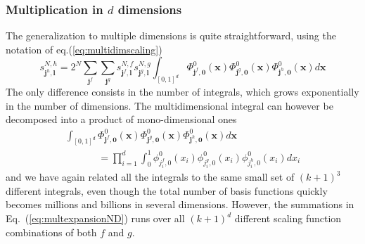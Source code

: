 \subsubsection*{Multiplication in $d$ dimensions}
The generalization to multiple dimensions is quite straightforward, using the
notation of eq.(\ref{eq:multidimscaling})
\begin{equation}
    \label{eq:multexpansionND}
    s^{N,h}_{\boldsymbol{j}^h,\boldsymbol{l}} =
	2^N \sum_{\boldsymbol{j}^f}\sum_{\boldsymbol{j}^g} 
	s_{\boldsymbol{j}^f,\boldsymbol{l}}^{N,f} 
	s_{\boldsymbol{j}^g,\boldsymbol{l}}^{N,g} \int_{[0,1]^d}
	\Phi_{\boldsymbol{j}^f,\boldsymbol{0}}^0(\boldsymbol{x})
	\Phi_{\boldsymbol{j}^g,\boldsymbol{0}}^0(\boldsymbol{x})
	\Phi_{\boldsymbol{j}^h,\boldsymbol{0}}^0(\boldsymbol{x})
	d\boldsymbol{x}
\end{equation}
The only difference consists in the number of integrals, which grows
exponentially in the number of dimensions. The multidimensional integral can
however be decomposed into a product of mono-dimensional ones
\begin{align}
    \nonumber
    \int_{[0,1]^d} 
    \Phi_{\boldsymbol{j}^f,\boldsymbol{0}}^0(\boldsymbol{x})
    \Phi_{\boldsymbol{j}^g,\boldsymbol{0}}^0(\boldsymbol{x})
    \Phi_{\boldsymbol{j}^h,\boldsymbol{0}}^0(\boldsymbol{x})
    d\boldsymbol{x}\ \ \ \ \ \ \ \ \ \ \ \ \ \ \ \ \ \ \ \ \ \ \ \ \ \ \\
    \ \ \ \ \ \ \ \ \ \ \ \ \ \ \ 
    = 	\prod_{i=1}^d \int_0^1
	\phi_{j_i^f,0}^0(x_i)\phi_{j_i^g,0}^0(x_i)\phi_{j_i^h,0}^0(x_i)dx_i
\end{align}
and we have again related all the integrals to the same small set of 
$(k+1)^3$ different integrals, even though the total number of basis functions
quickly becomes millions and billions in several dimensions. However, the 
summations in Eq.~(\ref{eq:multexpansionND}) runs over all $(k+1)^d$ different 
scaling function combinations of both $f$ and $g$.


